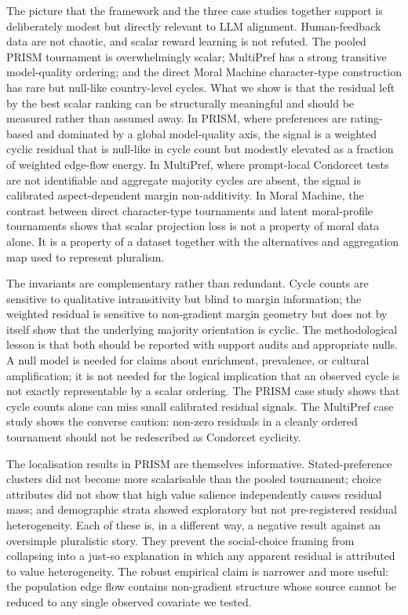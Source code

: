 \documentclass[10pt]{article}
\theoremstyle{definition}
\theoremstyle{remark}
\begin{document}
The picture that the framework and the three case studies together support is deliberately modest but directly relevant to LLM alignment. Human-feedback data are not chaotic, and scalar reward learning is not refuted. The pooled PRISM tournament is overwhelmingly scalar; MultiPref has a strong transitive model-quality ordering; and the direct Moral Machine character-type construction has rare but null-like country-level cycles. What we show is that the residual left by the best scalar ranking can be structurally meaningful and should be measured rather than assumed away. In PRISM, where preferences are rating-based and dominated by a global model-quality axis, the signal is a weighted cyclic residual that is null-like in cycle count but modestly elevated as a fraction of weighted edge-flow energy. In MultiPref, where prompt-local Condorcet tests are not identifiable and aggregate majority cycles are absent, the signal is calibrated aspect-dependent margin non-additivity. In Moral Machine, the contrast between direct character-type tournaments and latent moral-profile tournaments shows that scalar projection loss is not a property of moral data alone. It is a property of a dataset together with the alternatives and aggregation map used to represent pluralism.

The invariants are complementary rather than redundant. Cycle counts are sensitive to qualitative intransitivity but blind to margin information; the weighted residual is sensitive to non-gradient margin geometry but does not by itself show that the underlying majority orientation is cyclic. The methodological lesson is that both should be reported with support audits and appropriate nulls. A null model is needed for claims about enrichment, prevalence, or cultural amplification; it is not needed for the logical implication that an observed cycle is not exactly representable by a scalar ordering. The PRISM case study shows that cycle counts alone can miss small calibrated residual signals. The MultiPref case study shows the converse caution: non-zero residuals in a cleanly ordered tournament should not be redescribed as Condorcet cyclicity.

The localisation results in PRISM are themselves informative. Stated-preference clusters did not become more scalarisable than the pooled tournament; choice attributes did not show that high value salience independently causes residual mass; and demographic strata showed exploratory but not pre-registered residual heterogeneity. Each of these is, in a different way, a negative result against an oversimple pluralistic story. They prevent the social-choice framing from collapsing into a just-so explanation in which any apparent residual is attributed to value heterogeneity. The robust empirical claim is narrower and more useful: the population edge flow contains non-gradient structure whose source cannot be reduced to any single observed covariate we tested.
\end{document}
